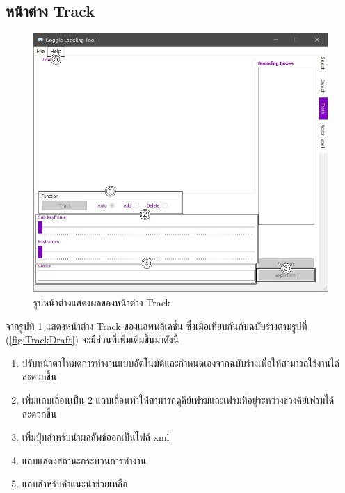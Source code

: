 \subsection*{หน้าต่าง Track}
\begin{figure}[!ht]
  \centering
    \includegraphics[scale=0.4]{chapter4/images/Final_ui/Track.jpg}
    \caption{รูปหน้าต่างแสดงผลของหน้าต่าง Track}
    \label{fig:final_track}
\end{figure}
จากรูปที่ \ref{fig:final_track} แสดงหน้าต่าง Track ของแอพพลิเคชั่น ซึ่งเมื่อเทียบกันกับฉบับร่างตามรูปที่ (\ref{fig:TrackDraft}) จะมีส่วนที่เพิ่มเติมขึ้นมาดังนี้
\begin{enumerate}
	\item ปรับหน้าตาโหมดการทำงานแบบอัตโนมัติและกำหนดเองจากฉบับร่างเพื่อให้สามารถใช้งานได้สะดวกขึ้น
	\item เพิ่มแถบเลื่อนเป็น 2 แถบเลื่อนทำให้สามารถดูคีย์เฟรมและเฟรมที่อยู่ระหว่างช่วงคีย์เฟรมได้สะดวกขึ้น
	\item เพิ่มปุ่มสำหรับนำผลลัพธ์ออกเป็นไฟล์ xml 
	\item แถบแสดงสถานะกระบวนการทำงาน
	\item แถบสำหรับคำแนะนำช่วยเหลือ
\end{enumerate}		

\clearpage
